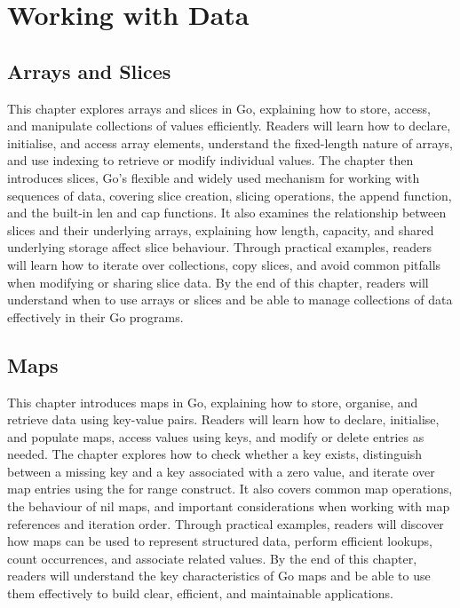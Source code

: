 \documentclass[12pt,oneside]{book}
\begin{document}
\part{Working with Data}

\chapter{Arrays and Slices}
\begin{chaptersummary}
This chapter explores arrays and slices in Go, explaining how to store, access, and manipulate collections of values efficiently. Readers will learn how to declare, initialise, and access array elements, understand the fixed-length nature of arrays, and use indexing to retrieve or modify individual values. The chapter then introduces slices, Go’s flexible and widely used mechanism for working with sequences of data, covering slice creation, slicing operations, the append function, and the built-in len and cap functions. It also examines the relationship between slices and their underlying arrays, explaining how length, capacity, and shared underlying storage affect slice behaviour. Through practical examples, readers will learn how to iterate over collections, copy slices, and avoid common pitfalls when modifying or sharing slice data. By the end of this chapter, readers will understand when to use arrays or slices and be able to manage collections of data effectively in their Go programs.
\end{chaptersummary}


\chapter{Maps}
\begin{chaptersummary}
This chapter introduces maps in Go, explaining how to store, organise, and retrieve data using key-value pairs. Readers will learn how to declare, initialise, and populate maps, access values using keys, and modify or delete entries as needed. The chapter explores how to check whether a key exists, distinguish between a missing key and a key associated with a zero value, and iterate over map entries using the for range construct. It also covers common map operations, the behaviour of nil maps, and important considerations when working with map references and iteration order. Through practical examples, readers will discover how maps can be used to represent structured data, perform efficient lookups, count occurrences, and associate related values. By the end of this chapter, readers will understand the key characteristics of Go maps and be able to use them effectively to build clear, efficient, and maintainable applications.
\end{chaptersummary}

\end{document}
